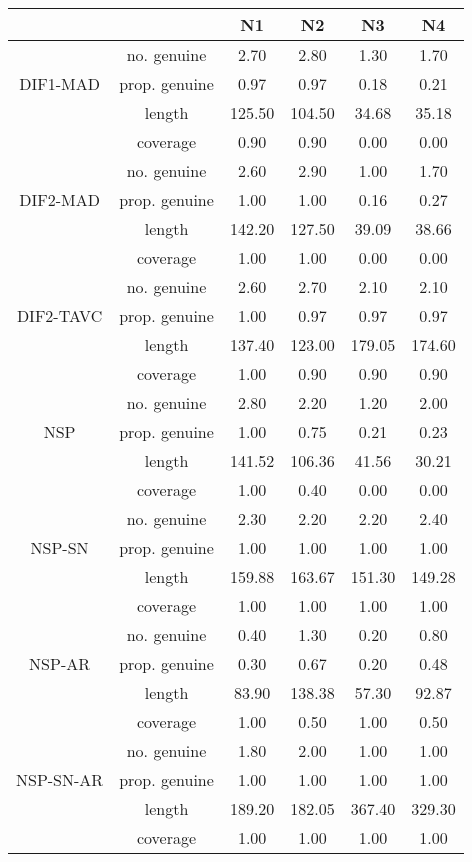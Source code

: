 \begin{tabular}{|c|c|c|c|c|c|}
  \hline
 &  & N1 & N2 & N3 & N4 \\ 
  \hline
 & no. genuine & 2.70 & 2.80 & 1.30 & 1.70 \\ 
  DIF1-MAD & prop. genuine & 0.97 & 0.97 & 0.18 & 0.21 \\ 
   & length & 125.50 & 104.50 & 34.68 & 35.18 \\ 
   & coverage & 0.90 & 0.90 & 0.00 & 0.00 \\ 
   & no. genuine & 2.60 & 2.90 & 1.00 & 1.70 \\ 
  DIF2-MAD & prop. genuine & 1.00 & 1.00 & 0.16 & 0.27 \\ 
   & length & 142.20 & 127.50 & 39.09 & 38.66 \\ 
   & coverage & 1.00 & 1.00 & 0.00 & 0.00 \\ 
   & no. genuine & 2.60 & 2.70 & 2.10 & 2.10 \\ 
  DIF2-TAVC & prop. genuine & 1.00 & 0.97 & 0.97 & 0.97 \\ 
   & length & 137.40 & 123.00 & 179.05 & 174.60 \\ 
   & coverage & 1.00 & 0.90 & 0.90 & 0.90 \\ 
   & no. genuine & 2.80 & 2.20 & 1.20 & 2.00 \\ 
  NSP & prop. genuine & 1.00 & 0.75 & 0.21 & 0.23 \\ 
   & length & 141.52 & 106.36 & 41.56 & 30.21 \\ 
   & coverage & 1.00 & 0.40 & 0.00 & 0.00 \\ 
   & no. genuine & 2.30 & 2.20 & 2.20 & 2.40 \\ 
  NSP-SN & prop. genuine & 1.00 & 1.00 & 1.00 & 1.00 \\ 
   & length & 159.88 & 163.67 & 151.30 & 149.28 \\ 
   & coverage & 1.00 & 1.00 & 1.00 & 1.00 \\ 
   & no. genuine & 0.40 & 1.30 & 0.20 & 0.80 \\ 
  NSP-AR & prop. genuine & 0.30 & 0.67 & 0.20 & 0.48 \\ 
   & length & 83.90 & 138.38 & 57.30 & 92.87 \\ 
   & coverage & 1.00 & 0.50 & 1.00 & 0.50 \\ 
   & no. genuine & 1.80 & 2.00 & 1.00 & 1.00 \\ 
  NSP-SN-AR & prop. genuine & 1.00 & 1.00 & 1.00 & 1.00 \\ 
   & length & 189.20 & 182.05 & 367.40 & 329.30 \\ 
   & coverage & 1.00 & 1.00 & 1.00 & 1.00 \\ 
   \hline
\end{tabular}
